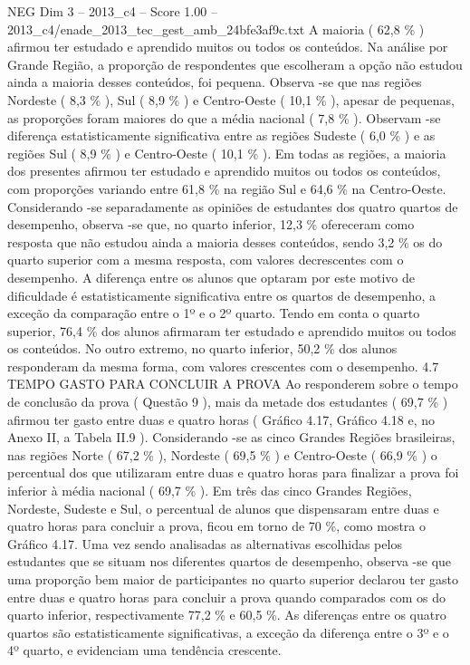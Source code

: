 \begin{textsample}{NEG Dim 3 – 2013\_c4 – Score 1.00 – 2013\_c4/enade\_2013\_tec\_gest\_amb\_24bfe3af9c.txt}
A maioria ( 62,8 \% ) afirmou ter estudado e aprendido muitos ou todos os conteúdos.
Na análise por Grande Região, a proporção de respondentes que escolheram a opção não estudou ainda a maioria desses conteúdos, foi pequena.
Observa -se que nas regiões Nordeste ( 8,3 \% ), Sul ( 8,9 \% ) e Centro-Oeste ( 10,1 \% ), apesar de pequenas, as proporções foram maiores do que a média nacional ( 7,8 \% ).
Observam -se diferença estatisticamente significativa entre as regiões Sudeste ( 6,0 \% ) e as regiões Sul ( 8,9 \% ) e Centro-Oeste ( 10,1 \% ).
Em todas as regiões, a maioria dos presentes afirmou ter estudado e aprendido muitos ou todos os conteúdos, com proporções variando entre 61,8 \% na região Sul e 64,6 \% na Centro-Oeste.
Considerando -se separadamente as opiniões de estudantes dos quatro quartos de desempenho, observa -se que, no quarto inferior, 12,3 \% ofereceram como resposta que não estudou ainda a maioria desses conteúdos, sendo 3,2 \% os do quarto superior com a mesma resposta, com valores decrescentes com o desempenho.
A diferença entre os alunos que optaram por este motivo de dificuldade é estatisticamente significativa entre os quartos de desempenho, a exceção da comparação entre o 1º e o 2º quarto.
Tendo em conta o quarto superior, 76,4 \% dos alunos afirmaram ter estudado e aprendido muitos ou todos os conteúdos.
No outro extremo, no quarto inferior, 50,2 \% dos alunos responderam da mesma forma, com valores crescentes com o desempenho. 4.7 TEMPO GASTO PARA CONCLUIR A PROVA Ao responderem sobre o tempo de conclusão da prova ( Questão 9 ), mais da metade dos estudantes ( 69,7 \% ) afirmou ter gasto entre duas e quatro horas ( Gráfico 4.17, Gráfico 4.18 e, no Anexo II, a Tabela II.9 ).
Considerando -se as cinco Grandes Regiões brasileiras, nas regiões Norte ( 67,2 \% ), Nordeste ( 69,5 \% ) e Centro-Oeste ( 66,9 \% ) o percentual dos que utilizaram entre duas e quatro horas para finalizar a prova foi inferior à média nacional ( 69,7 \% ).
Em três das cinco Grandes Regiões, Nordeste, Sudeste e Sul, o percentual de alunos que dispensaram entre duas e quatro horas para concluir a prova, ficou em torno de 70 \%, como mostra o Gráfico 4.17.
Uma vez sendo analisadas as alternativas escolhidas pelos estudantes que se situam nos diferentes quartos de desempenho, observa -se que uma proporção bem maior de participantes no quarto superior declarou ter gasto entre duas e quatro horas para concluir a prova quando comparados com os do quarto inferior, respectivamente 77,2 \% e 60,5 \%.
As diferenças entre os quatro quartos são estatisticamente significativas, a exceção da diferença entre o 3º e o 4º quarto, e evidenciam uma tendência crescente.

\end{textsample}
